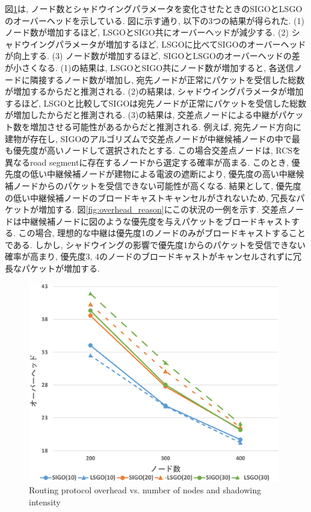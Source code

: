 \documentclass[10pt]{jreport}
\begin{document}
図\ref{fig:SIGO_overhead}は, ノード数とシャドウイングパラメータを変化させたときのSIGOとLSGOのオーバーヘッドを示している.
図に示す通り, 以下の3つの結果が得られた.
(1) ノード数が増加するほど, LSGOとSIGO共にオーバーヘッドが減少する.
(2) シャドウイングパラメータが増加するほど, LSGOに比べてSIGOのオーバーヘッドが向上する.
(3) ノード数が増加するほど, SIGOとLSGOのオーバーヘッドの差が小さくなる.
(1)の結果は, LSGOとSIGO共にノード数が増加すると, 各送信ノードに隣接するノード数が増加し, 宛先ノードが正常にパケットを受信した総数が増加するからだと推測される.
(2)の結果は, シャドウイングパラメータが増加するほど, LSGOと比較してSIGOは宛先ノードが正常にパケットを受信した総数が増加したからだと推測される. 
(3)の結果は, 交差点ノードによる中継がパケット数を増加させる可能性があるからだと推測される.
例えば, 宛先ノード方向に建物が存在し, SIGOのアルゴリズムで交差点ノードが中継候補ノードの中で最も優先度が高いノードして選択されたとする. この場合交差点ノードは, RCSを異なるroad segmentに存在するノードから選定する確率が高まる. このとき, 優先度の低い中継候補ノードが建物による電波の遮断により, 優先度の高い中継候補ノードからのパケットを受信できない可能性が高くなる. 結果として, 優先度の低い中継候補ノードのブロードキャストキャンセルがされないため, 冗長なパケットが増加する.
図\ref{fig:overhead_reason}にこの状況の一例を示す.
交差点ノードは中継候補ノードに図のような優先度を与えパケットをブロードキャストする. この場合, 理想的な中継は優先度1のノードのみがブロードキャストすることである. しかし, シャドウイングの影響で優先度1からのパケットを受信できない確率が高まり, 優先度3, 4のノードのブロードキャストがキャンセルされずに冗長なパケットが増加する. 


\begin{figure}[!ht]
	\centering
	\includegraphics[width=110mm]{figures/SIGO_overhead.eps}
	\caption{Routing protocol overhead vs. number of nodes and shadowing intensity}
	\label{fig:SIGO_overhead}
\end{figure}
\end{document}
